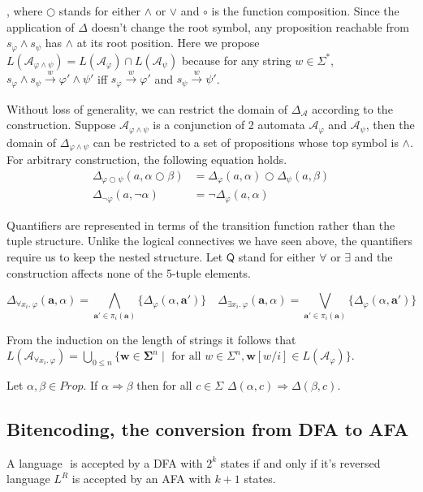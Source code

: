 , where \( \bigcirc \) stands for either \( \wedge \) or \( \vee \) and \( \circ
\) is the function composition. Since the application of \( \Delta \) doesn't
change the root symbol, any proposition reachable from \(s_\varphi \wedge s_\psi
\) has \( \wedge \) at its root position. Here we propose \(
L(\mathcal{A}_{\varphi \wedge \psi}) = L(\mathcal{A}_{\varphi}) \cap
L(\mathcal{A}_{\psi}) \) because for any string \( w \in \Sigma^* \), \(
s_\varphi \wedge s_\psi \xrightarrow[]w \varphi' \wedge \psi' \) iff \(
s_\varphi \xrightarrow[]w \varphi' \) and \( s_\psi \xrightarrow[]w \psi' \).

Without loss of generality, we can restrict the domain of \(
\Delta_{\mathcal{A}} \) according to the construction. Suppose \(
\mathcal{A}_{\varphi \wedge \psi} \) is a conjunction of 2 automata \(
\mathcal{A}_{\varphi} \) and \( \mathcal{A}_{\psi} \), then the domain of \(
\Delta_{\varphi \wedge \psi} \) can be restricted to a set of propositions whose
top symbol is \( \wedge \). For arbitrary construction, the following equation
holds.
\begin{align*}
  \Delta_{\varphi \bigcirc \psi}(a, \alpha \bigcirc \beta) &=
  \Delta_\varphi(a, \alpha) \bigcirc \Delta_\psi(a, \beta) \\
  \Delta_{\neg \varphi}(a, \neg \alpha) &= \neg \Delta_\varphi(a, \alpha)
\end{align*}

Quantifiers are represented in terms of the transition function rather than the
tuple structure. Unlike the logical connectives we have seen above, the
quantifiers require us to keep the nested structure. Let \( \mathsf{Q} \) stand
for either \( \forall \) or \( \exists \) and the construction affects none of
the 5-tuple elements.

\[
\Delta_{\forall x_i .\ \varphi}(\mathbf{a}, \alpha) =
\bigwedge\limits_{\mathbf{a}' \in \pi_i(\mathbf{a})} 
\{ \Delta_{\varphi}(\alpha, \mathbf{a}') \}
\quad
\Delta_{\exists x_i .\ \varphi}(\mathbf{a}, \alpha) = 
\bigvee  \limits_{\mathbf{a}' \in \pi_i(\mathbf{a})} 
\{ \Delta_{\varphi}(\alpha, \mathbf{a}') \}
\]

From the induction on the length of strings it follows that
\(L(\mathcal{A}_{\forall x_i .\ \varphi}) = \bigcup\limits_{0 \leq n}\{
\mathbf{w} \in \boldsymbol{\Sigma}^n \mid \text{ for all } w \in \Sigma^n ,
\mathbf{w}[w/i]\in L(\mathcal{A}_{\varphi}) \} \).

\begin{lemma}
Let \(\alpha, \beta \in \mathit{Prop} \). If \( \alpha \Rightarrow \beta \) then for all
\( c \in \Sigma \) \( \Delta(\alpha, c) \Rightarrow \Delta(\beta, c) \).
\end{lemma}

\subsection{Bitencoding, the conversion from DFA to AFA}
\begin{theorem}
A language \(\) is accepted by a DFA with \( 2^k \) states if and only if it's reversed
language \( L^R \) is accepted by an AFA with \( k + 1 \) states.
\end{theorem}
